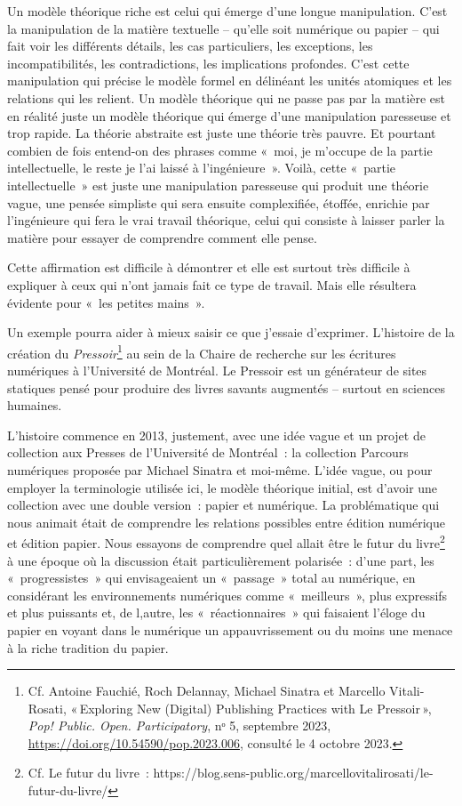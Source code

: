 Un modèle théorique riche est celui qui émerge d'une longue
manipulation. C'est la manipulation de la matière textuelle -- qu'elle
soit numérique ou papier -- qui fait voir les différents détails, les
cas particuliers, les exceptions, les incompatibilités, les
contradictions, les implications profondes. C'est cette manipulation qui
précise le modèle formel en délinéant les unités atomiques et les
relations qui les relient. Un modèle théorique qui ne passe pas par la
matière est en réalité juste un modèle théorique qui émerge d'une
manipulation paresseuse et trop rapide. La théorie abstraite est juste
une théorie très pauvre. Et pourtant combien de fois entend-on des
phrases comme «~moi, je m'occupe de la partie intellectuelle, le reste
je l'ai laissé à l'ingénieure~». Voilà, cette «~partie intellectuelle~»
est juste une manipulation paresseuse qui produit une théorie vague, une
pensée simpliste qui sera ensuite complexifiée, étoffée, enrichie par
l'ingénieure qui fera le vrai travail théorique, celui qui consiste à
laisser parler la matière pour essayer de comprendre comment elle pense.

Cette affirmation est difficile à démontrer et elle est surtout très
difficile à expliquer à ceux qui n'ont jamais fait ce type de travail.
Mais elle résultera évidente pour «~les petites mains~».

Un exemple pourra aider à mieux saisir ce que j'essaie d'exprimer.
L'histoire de la création du \emph{Pressoir}\footnote{Cf. Antoine
  Fauchié, Roch Delannay, Michael Sinatra et Marcello Vitali-Rosati,
  {«\,Exploring {New} ({Digital}) {Publishing} {Practices} with {Le}
  {Pressoir}\,»}, \emph{Pop! Public. Open. Participatory}, nᵒ 5,
  septembre 2023, \url{https://doi.org/10.54590/pop.2023.006}, consulté
  le 4 octobre 2023.} au sein de la Chaire de recherche sur les
écritures numériques à l'Université de Montréal. Le Pressoir est un
générateur de sites statiques pensé pour produire des livres savants
augmentés -- surtout en sciences humaines.

L'histoire commence en 2013, justement, avec une idée vague et un projet
de collection aux Presses de l'Université de Montréal~: la collection
Parcours numériques proposée par Michael Sinatra et moi-même. L'idée
vague, ou pour employer la terminologie utilisée ici, le modèle
théorique initial, est d'avoir une collection avec une double version~:
papier et numérique. La problématique qui nous animait était de
comprendre les relations possibles entre édition numérique et édition
papier. Nous essayons de comprendre quel allait être le futur du
livre\footnote{Cf. Le futur du livre~:
  https://blog.sens-public.org/marcellovitalirosati/le-futur-du-livre/}
à une époque où la discussion était particulièrement polarisée~: d'une
part, les «~progressistes~» qui envisageaient un «~passage~» total au
numérique, en considérant les environnements numériques comme
«~meilleurs~», plus expressifs et plus puissants et, de l,autre, les
«~réactionnaires~» qui faisaient l'éloge du papier en voyant dans le
numérique un appauvrissement ou du moins une menace à la riche tradition
du papier.

